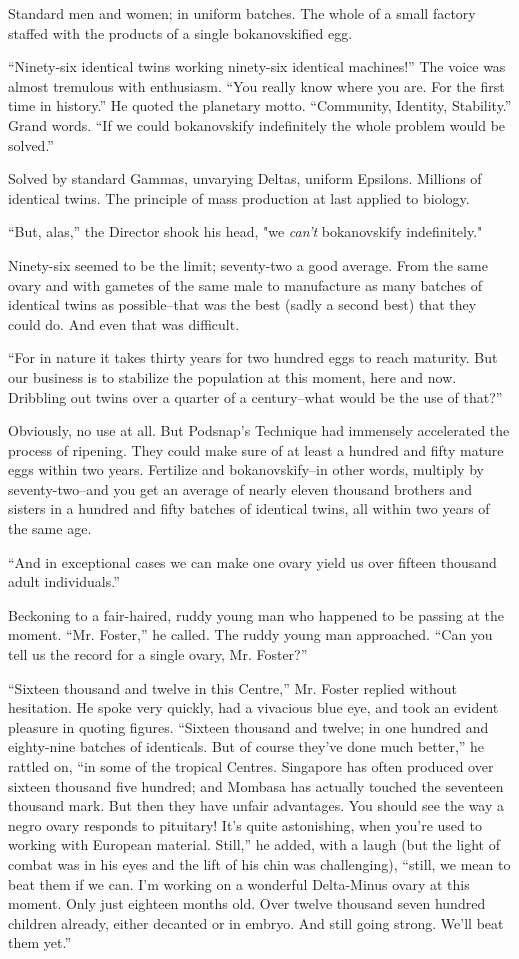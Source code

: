 \documentclass[12pt]{report}
\begin{document}
Standard men and women; in uniform batches. The whole of a small factory
staffed with the products of a single bokanovskified egg.

``Ninety-six identical twins working ninety-six identical machines!''
The voice was almost tremulous with enthusiasm. ``You really know where
you are. For the first time in history.'' He quoted the planetary motto.
``Community, Identity, Stability.'' Grand words. ``If we could
bokanovskify indefinitely the whole problem would be solved.''

Solved by standard Gammas, unvarying Deltas, uniform Epsilons. Millions
of identical twins. The principle of mass production at last applied to
biology.

``But, alas,'' the Director shook his head, "we \emph{can't}
bokanovskify indefinitely."

Ninety-six seemed to be the limit; seventy-two a good average. From the
same ovary and with gametes of the same male to manufacture as many
batches of identical twins as possible--that was the best (sadly a
second best) that they could do. And even that was difficult.

``For in nature it takes thirty years for two hundred eggs to reach
maturity. But our business is to stabilize the population at this
moment, here and now. Dribbling out twins over a quarter of a
century--what would be the use of that?''

Obviously, no use at all. But Podsnap's Technique had immensely
accelerated the process of ripening. They could make sure of at least a
hundred and fifty mature eggs within two years. Fertilize and
bokanovskify--in other words, multiply by seventy-two--and you get an
average of nearly eleven thousand brothers and sisters in a hundred and
fifty batches of identical twins, all within two years of the same age.

``And in exceptional cases we can make one ovary yield us over fifteen
thousand adult individuals.''

Beckoning to a fair-haired, ruddy young man who happened to be passing
at the moment. ``Mr. Foster,'' he called. The ruddy young man
approached. ``Can you tell us the record for a single ovary, Mr.
Foster?''

``Sixteen thousand and twelve in this Centre,'' Mr. Foster replied
without hesitation. He spoke very quickly, had a vivacious blue eye, and
took an evident pleasure in quoting figures. ``Sixteen thousand and
twelve; in one hundred and eighty-nine batches of identicals. But of
course they've done much better,'' he rattled on, ``in some of the
tropical Centres. Singapore has often produced over sixteen thousand
five hundred; and Mombasa has actually touched the seventeen thousand
mark. But then they have unfair advantages. You should see the way a
negro ovary responds to pituitary! It's quite astonishing, when you're
used to working with European material. Still,'' he added, with a laugh
(but the light of combat was in his eyes and the lift of his chin was
challenging), ``still, we mean to beat them if we can. I'm working on a
wonderful Delta-Minus ovary at this moment. Only just eighteen months
old. Over twelve thousand seven hundred children already, either
decanted or in embryo. And still going strong. We'll beat them yet.''
\end{document}
